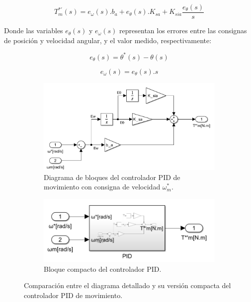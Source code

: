 \documentclass{article}
\begin{document}
\begin{equation}
T_m^{*'}(s) = e_\omega(s).b_a + e_\theta(s).K_{sa} + K_{sia}\frac{e_\theta(s)}{s}
\label{eq:torque_controlador}
\end{equation}

Donde las variables $e_\theta(s)$ y $e_\omega(s)$ representan los errores entre las consignas de posición y velocidad angular, y el valor 
medido, respectivamente:

\begin{equation}
e_\theta(s) = \theta^*(s) - \theta(s)
\end{equation}

\begin{equation}
e_\omega(s) = e_\theta(s).s
\end{equation}

\begin{figure}[H]
    \centering
    \begin{subfigure}[t]{0.6\textwidth}
        \centering
        \includegraphics[width=\textwidth]{Imagenes/DiagramaBloquesPIDdesagregado.png}
        \caption{Diagrama de bloques del controlador PID de movimiento con consigna de velocidad \(\omega^*_m\).}
        \label{fig:DiagramaBloquesPIDdesagregado}
    \end{subfigure}
    \hfill %
    \begin{subfigure}[t]{0.35\textwidth}
        \centering
        \includegraphics[width=\textwidth]{Imagenes/DiagramaBloquesPIDcompacto.png}
        \caption{Bloque compacto del controlador PID.}
        \label{fig:DiagramaBloquesPIDcompacto}
    \end{subfigure}
    
    \caption{Comparación entre el diagrama detallado y su versión compacta del controlador PID de movimiento.}
    \label{fig:DiagramaBloquesControladorPID}
\end{figure}
\end{document}
